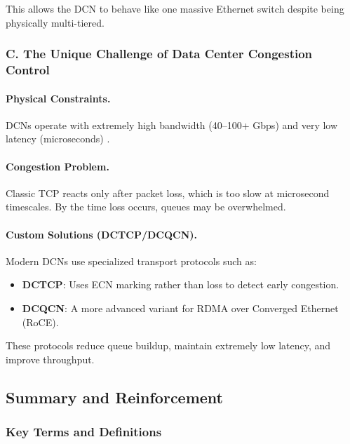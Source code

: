 \documentclass[12pt]{article}
\begin{document}
This allows the DCN to behave like one massive Ethernet switch despite being physically multi-tiered.


\subsubsection{C. The Unique Challenge of Data Center Congestion Control}

\paragraph*{Physical Constraints.}
DCNs operate with extremely high bandwidth (40--100+ Gbps) and very low latency (microseconds) \cite{13780}.

\paragraph*{Congestion Problem.}
Classic TCP reacts only after packet loss, which is too slow at microsecond timescales. By the time loss occurs, queues may be overwhelmed.

\paragraph*{Custom Solutions (DCTCP/DCQCN).}
\cite{13780,13794} Modern DCNs use specialized transport protocols such as:
\begin{itemize}
    \item \textbf{DCTCP}: Uses ECN marking rather than loss to detect early congestion.
    \item \textbf{DCQCN}: A more advanced variant for RDMA over Converged Ethernet (RoCE).
\end{itemize}

These protocols reduce queue buildup, maintain extremely low latency, and improve throughput.


\subsection{Summary and Reinforcement}

\subsubsection{Key Terms and Definitions}
\end{document}
